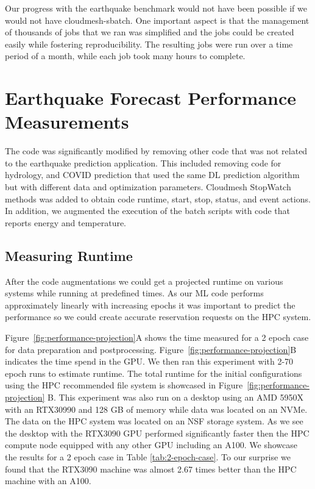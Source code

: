 \documentclass[utf8]{FrontiersinVancouver} %
\begin{document}
{Our progress with the earthquake benchmark would not have been
possible if we would not have cloudmesh-sbatch. One important aspect
is that the management of thousands of jobs that we ran was simplified
and the jobs could be created easily while fostering
reproducibility. The resulting jobs were run over a time period of a
month, while each job took many hours to complete.





\section{Earthquake Forecast Performance Measurements}
\label{sec:perf-main}

The code was significantly modified by removing other code that was
not related to the earthquake prediction application. This included
removing code for hydrology, and COVID prediction that used the same
DL prediction algorithm but with different data and optimization
parameters. Cloudmesh StopWatch methods was added to obtain code
runtime, start, stop, status, and event actions. In addition, we
augmented the execution of the batch scripts with code that reports
energy and temperature.

\subsection{Measuring Runtime}
\label{sec:perf-runtime}

After the code augmentations we could get a projected runtime on
various systems while running at predefined times. As our ML code
performs approximately linearly with increasing epochs it was
important to predict the performance so we could create accurate
reservation requests on the HPC system.

Figure~\ref{fig:performance-projection}A shows the time measured for a
2 epoch case for data preparation and postprocessing.
Figure~\ref{fig:performance-projection}B indicates the time spend in
the GPU.  We then ran this experiment with 2-70 epoch runs to estimate
runtime.  The total runtime for the initial configurations using the
HPC recommended file system is showcased in
Figure~\ref{fig:performance-projection} B.  This experiment was also
run on a desktop using an AMD 5950X with an RTX30990 and 128 GB of
memory while data was located on an NVMe.  The data on the HPC system
was located on an NSF storage system.  As we see the desktop with the
RTX3090 GPU performed significantly faster then the HPC compute node
equipped with any other GPU including an A100.  We showcase the
results for a 2 epoch case in Table \ref{tab:2-epoch-case}.  To our
surprise we found that the RTX3090 machine was almost 2.67 times
better than the HPC machine with an A100.

}
\end{document}
